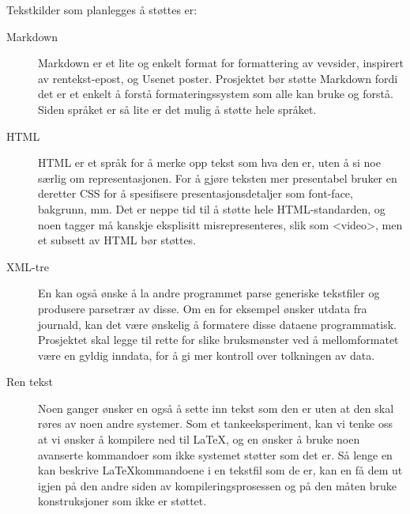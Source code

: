 Tekstkilder som planlegges å støttes er:
\begin{description}
\item [Markdown]
  Markdown er et lite og enkelt format for formattering av vevsider, inspirert av rentekst-epost, og Usenet poster.
  Prosjektet bør støtte Markdown fordi det er et enkelt å forstå formateringssystem som alle kan bruke og forstå.
  Siden språket er så lite er det mulig å støtte hele språket.
\item [HTML]
  HTML er et språk for å merke opp tekst som hva den er, uten å si noe særlig om representasjonen.
  For å gjøre teksten mer presentabel bruker en deretter CSS for å spesifisere presentasjonsdetaljer som font-face, bakgrunn, mm.
  Det er neppe tid til å støtte hele HTML-standarden, og noen tagger må kanskje eksplisitt misrepresenteres, slik som <video>,
  men et subsett av HTML bør støttes.
\item [XML-tre]
  En kan også ønske å la andre programmet parse generiske tekstfiler og produsere parsetrær av disse.
  Om en for eksempel ønsker utdata fra journald, kan det være ønskelig å formatere disse dataene programmatisk.
  Prosjektet skal legge til rette for slike bruksmønster ved å mellomformatet være en gyldig inndata, for å gi mer kontroll over tolkningen av data.
\item [Ren tekst]
  Noen ganger ønsker en også å sette inn tekst som den er uten at den skal røres av noen andre systemer.
  Som et tankeeksperiment, kan vi tenke oss at vi ønsker å kompilere ned til \LaTeX,
  og en ønsker å bruke noen avanserte kommandoer som ikke systemet støtter som det er.
  Så lenge en kan beskrive \LaTeX kommandoene i en tekstfil som de er,
  kan en få dem ut igjen på den andre siden av kompileringsprosessen og på den måten bruke konstruksjoner som ikke er støttet.
\end{description}


